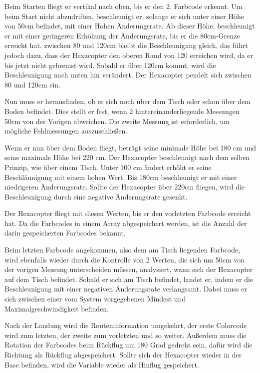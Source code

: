     Beim Starten fliegt er vertikal nach oben, bis er den 2. Farbcode erkennt. Um beim Start nicht abzudriften, beschleunigt er, solange er sich unter einer Höhe von 50cm befindet, mit einer Hohen Änderungsrate. Ab dieser Höhe, beschleunigt er mit einer geringeren Erhöhung der Änderungsrate, bis er die 80cm-Grenze erreicht hat.
    zwischen 80 und 120cm bleibt die Beschleunigung gleich, das führt jedoch dazu, dass der Hexacopter den oberen Rand von 120 erreichen wird, da er bis jetzt nicht gebremst wird. Sobald er über 120cm kommt, wird die Beschleunigung nach unten hin verändert. Der Hexacopter pendelt sich zwischen 80 und 120cm ein.

    Nun muss er herausfinden, ob er sich noch über dem Tisch oder schon über dem Boden befindet. Dies stellt er fest, wenn 2 hintereinanderliegende Messungen 50cm von der Vorigen abweichen. Die zweite Messung ist erforderlich, um mögliche Fehlmessungen auszuschließen.

    Wenn er nun über dem Boden fliegt, beträgt seine minimale Höhe bei 180 cm und seine maximale Höhe bei 220 cm.
    Der Hexacopter beschleunigt nach dem selben Prinzip, wie über einem Tisch. Unter 100 cm ändert erhöht er seine Beschläunigung mit einem hohen Wert. Bis 180cm beschleunigt er mit einer niedrigeren Änderungsrate. Sollte der Hexacopter über 220cm fliegen, wird die Beschleunigung durch eine negative Änderungsrate gesenkt.

    Der Hexacopter fliegt mit diesen Werten, bis er den vorletzten Farbcode erreicht hat. Da die Farbcodes in einem Array abgespeichert werden, ist die Anzahl der darin gespeicherten Farbcodes bekannt.

    Beim letzten Farbcode angekommen, also dem am Tisch liegenden Farbcode, wird ebenfalls wieder durch die Kontrolle von 2 Werten, die sich um 50cm von der vorigen Messung unterscheiden müssen, analysiert, wann sich der Hexacopter auf dem Tisch befindet. Sobald er sich am Tisch befindet, landet er, indem er die Beschleunigung mit einer negativen Änderungsrate verlangsamt. Dabei muss er sich zwischen einer vom System vorgegebenen Mindest und Maximalgeschwindigkeit befinden.

    Nach der Landung wird die Routeninformation umgekehrt, der erste Colorcode wird zum letzten, der zweite zum vorletzten und so weiter. Außerdem muss die Rotation der Farbcodes beim Rückflug um 180 Grad gedreht sein, dafür wird die Richtung als Rückflug abgespeichert. Sollte sich der Hexacopter wieder in der Base befinden, wird die Variable wieder als Hinflug gespeichert.

